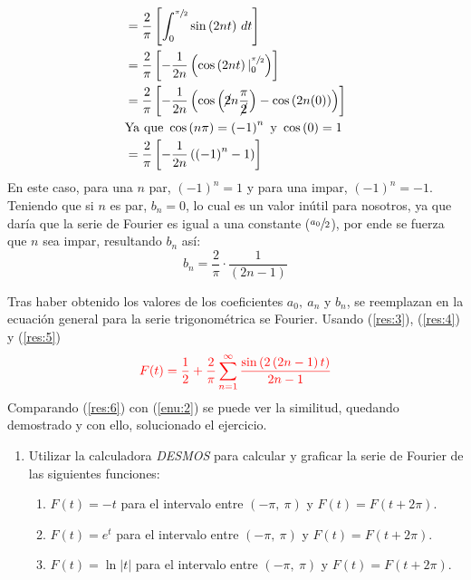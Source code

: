 \begin{multicols}{2}
\begin{align*}
    &= \frac{2}{\pi} \left[\int_{0}^{\sfrac{\pi}{2}}\sin\left(2nt\right) \,dt\right]\\
    &= \frac{2}{\pi} \left[-\frac{1}{2n} \left(\cos\left(2nt\right) |^{\sfrac{\pi}{2}}_{0}\right)\right]\\
    &= \frac{2}{\pi} \left[-\frac{1}{2n} \left(\cos\left(\cancel{2}n\frac{\pi}{\cancel{2}}\right) - \cos\left(2n(0)\right)\right)\right]\\
    &\mathrm{Ya~que}~\cos\left(n\pi\right) = \left(-1\right)^{n} \mathrm{~y~} \cos\left(0\right) = 1\\
    &= \frac{2}{\pi} \left[-\frac{1}{2n}\left(\left(-1\right)^{n} - 1\right)\right]
\end{align*}
En este caso, para una $n$ par, $\left(-1\right)^{n} = 1$ y para una impar, $\left(-1\right)^{n} = -1$. Teniendo que si $n$ es par, $b_n = 0$, lo cual es un valor inútil para nosotros, ya que daría que la serie de Fourier es igual a una constante ($\sfrac{a_0}{2}$), por ende se fuerza que $n$ sea impar, resultando $b_n$ así:
\begin{equation}
    b_n = \frac{2}{\pi} \cdot \frac{1}{\left(2n-1\right)}
    \label{res:5}
\end{equation}

Tras haber obtenido los valores de los coeficientes $a_0,~a_n$ y $b_n$, se reemplazan en la ecuación general para la serie trigonométrica se Fourier. Usando (\ref{res:3}), (\ref{res:4}) y (\ref{res:5})
\begin{equation}
    \textcolor{rojo}{F(t) = \frac{1}{2} + \frac{2}{\pi} \sum_{n = 1}^{\infty} \frac{\sin \left(2\left(2n-1\right)t\right)}{2n-1}}
    \label{res:6}
\end{equation}
Comparando (\ref{res:6}) con (\ref{enu:2}) se puede ver la similitud, quedando demostrado y con ello, solucionado el ejercicio.

\begin{enumerate}[leftmargin=15pt, resume]
    \item Utilizar la calculadora \textit{DESMOS} para calcular y graficar la serie de Fourier de las siguientes funciones:
    \begin{enumerate}
        \item $F(t) = -t$ para el intervalo entre $(-\pi,~\pi)$ y $F(t) = F\left(t+2\pi\right)$.
        \item $F(t) = e^{t}$ para el intervalo entre $(-\pi,~\pi)$ y $F(t) = F\left(t+2\pi\right)$.
        \item $F(t) = \ln |t|$ para el intervalo entre $(-\pi,~\pi)$ y $F(t) = F\left(t+2\pi\right)$.
    \end{enumerate}
\end{enumerate}


\end{multicols}
